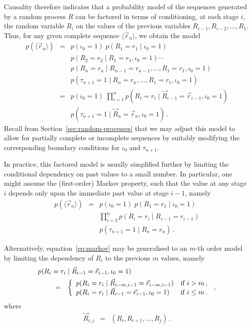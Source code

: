 \documentclass[a4paper]{article}
\begin{document}
Causality therefore indicates that a probability model of the sequences generated by a random
process $R$ can be factored in terms of conditioning, at each stage $i$, the random
variable $R_i$ on the values of the previous variables $R_{i-1},R_{i-2},\ldots,R_1$.
Thus, for any given complete sequence $\langle\vec{r}_n\rangle$, we obtain
the model
\begin{eqnarray}
p(\langle\vec{r}_{n}\rangle)
& = & 
p(\iota_0=1)\;
p(R_1=r_1\;|\;\iota_0=1)\;
\nonumber\\&&
p(R_2=r_2\;|\;R_1=r_1,\iota_0=1)\cdots
\nonumber\\&&
p(R_n=r_n\;|\;R_{n-1}=r_{n-1},\ldots,R_1=r_1,\iota_0=1)
\nonumber\\&&
p(\tau_{n+1}=1\;|\;R_n=r_n,\ldots,R_1=r_1,\iota_0=1)
\\
& = &
p(\iota_0=1)\;
\prod_{i=1}^{n}
p(R_i=r_i\;|\;\vec{R}_{i-1}=\vec{r}_{i-1},\iota_0=1)
\nonumber\\&&
p(\tau_{n+1}=1\;|\;\vec{R}_{n}=\vec{r}_{n},\iota_0=1)
\,.
\label{eq:markov}
\end{eqnarray}
Recall from Section~\ref{sec:random-processes} that we may adjust this model to allow for partially complete or incomplete sequences
by suitably modifying the corresponding boundary conditions for $\iota_0$ and $\tau_{n+1}$.

In practice, this factored model is usually simplified further by limiting the 
conditional dependency on past values to a small number.
In particular, one might assume the (first-order) Markov property, such that the value at any stage
$i$ depends only upon the immediate past value at stage $i-1$, namely
\begin{eqnarray}
p(\langle\vec{r}_{n}\rangle)
& = &
p(\iota_0=1)\;p(R_1=r_1\;|\;\iota_0=1)
\nonumber\\&&
\prod_{i=2}^{n}
p(R_i=r_i\;|\;R_{i-1}=r_{i-1})
\nonumber\\&&
p(\tau_{n+1}=1\;|\;R_{n}=r_{n})
\,.
\end{eqnarray}

Alternatively, equation~\eqref{eq:markov} may be generalised to an $m$-th order model
by limiting the dependency of $R_i$ to the previous $m$ values, namely
\begin{eqnarray}
p(R_i=r_i\;|\;\vec{R}_{i-1}=\vec{r}_{i-1},\iota_0=1)
\hspace*{-40mm} &&
\nonumber\\
& = &
\left\{
\begin{array}{ll}
p(R_i=r_i\;|\;\vec{R}_{i-m,i-1}=\vec{r}_{i-m,i-1})
& \mbox{if $i>m$}\,,
\\
p(R_i=r_i\;|\;\vec{R}_{i-1}=\vec{r}_{i-1}
,\iota_0=1)
& \mbox{if $i\le m$}\,.
\end{array}
\right.
\,,
\end{eqnarray}
where
\begin{eqnarray}
\vec{R}_{i,j}
& = &
(R_{i},R_{i+1},\ldots,R_{j})\,.
\end{eqnarray}


\end{document}
